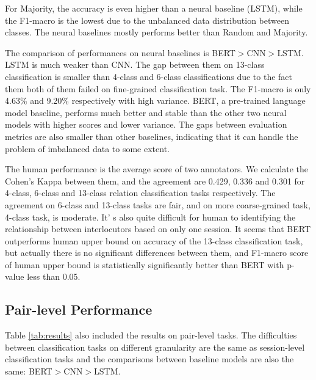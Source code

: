 For Majority, the accuracy is even higher than a neural baseline (LSTM), while the F1-macro is the lowest due to the unbalanced data distribution between classes. The neural baselines mostly performs better than Random and Majority.

The comparison of performances on neural baselines is BERT$>$CNN$>$LSTM. LSTM is much weaker than CNN. The gap between them on 13-class classification is smaller than 4-class and 6-class classifications due to the fact them both of them failed on fine-grained classification task. The F1-macro is only 4.63\% and 9.20\% respectively with high variance.
BERT, a pre-trained language model baseline, performs much better and stable than the other two neural models with higher scores and lower variance. The gaps between evaluation metrics are also smaller than other baselines, indicating that it can handle the problem of imbalanced data to some extent.

The human performance is the average score of two annotators. We calculate the Cohen's Kappa between them, and the agreement are 0.429, 0.336 and 0.301 for 4-class, 6-class and 13-class relation classification tasks respectively. The agreement on 6-class and 13-class tasks are fair, and on more coarse-grained task, 4-class task, is moderate. It' s also quite difficult for human to identifying the relationship between interlocutors based on only one session. It seems that BERT outperforms human upper bound on accuracy of the 13-class classification task, but actually there is no significant differences between them, and F1-macro score of human upper bound is statistically significantly better than BERT with p-value less than 0.05.



\subsection{Pair-level Performance}

\label{sec:pair}
Table \ref{tab:results} also included the results on pair-level tasks. The difficulties between classification tasks on different granularity are the same as session-level classification tasks and the comparisons between baseline models are also the same: BERT$>$CNN$>$LSTM. 


